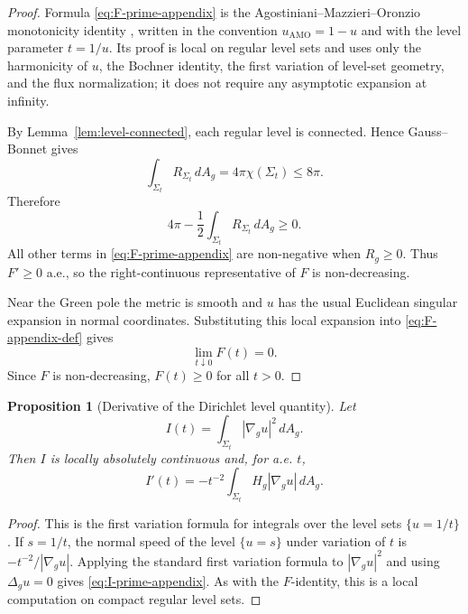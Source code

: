 \documentclass[11pt]{amsart}
\numberwithin{equation}{section}
\newtheorem{proposition}[theorem]{Proposition}
\theoremstyle{definition}
\begin{document}
\begin{proof}
Formula \eqref{eq:F-prime-appendix} is the Agostiniani--Mazzieri--Oronzio monotonicity identity \cite[Theorem~1.1, formula~(1.3)]{AMO}, written in the convention $u_{\mathrm{AMO}}=1-u$ and with the level parameter $t=1/u$.  Its proof is local on regular level sets and uses only the harmonicity of $u$, the Bochner identity, the first variation of level-set geometry, and the flux normalization; it does not require any asymptotic expansion at infinity.

By Lemma~\ref{lem:level-connected}, each regular level is connected.  Hence Gauss--Bonnet gives
$$
        \int_{\Sigma_t} R_{\Sigma_t}\,dA_g=4\pi\chi(\Sigma_t)\le8\pi.
$$
Therefore
$$
        4\pi-\frac12\int_{\Sigma_t}R_{\Sigma_t}\,dA_g\ge0.
$$
All other terms in \eqref{eq:F-prime-appendix} are non-negative when $R_g\ge0$.  Thus $F'\ge0$ a.e., so the right-continuous representative of $F$ is non-decreasing.

Near the Green pole the metric is smooth and $u$ has the usual Euclidean singular expansion in normal coordinates.  Substituting this local expansion into \eqref{eq:F-appendix-def} gives
$$
        \lim_{t\downarrow0}F(t)=0.
$$
Since $F$ is non-decreasing, $F(t)\ge0$ for all $t>0$.
\end{proof}

\begin{proposition}[Derivative of the Dirichlet level quantity]\label{prop:I-derivative}
Let
$$
        I(t)=\int_{\Sigma_t}|\nabla_g u|^2\,dA_g.
$$
Then $I$ is locally absolutely continuous and, for a.e. $t$,
\begin{equation}\label{eq:I-prime-appendix}
        I'(t)=-t^{-2}\int_{\Sigma_t}H_g|\nabla_g u|\,dA_g.
\end{equation}
\end{proposition}

\begin{proof}
This is the first variation formula for integrals over the level sets $\{u=1/t\}$.  If $s=1/t$, the normal speed of the level $\{u=s\}$ under variation of $t$ is $-t^{-2}/|\nabla_g u|$.  Applying the standard first variation formula to $|\nabla_g u|^2$ and using $\Delta_g u=0$ gives \eqref{eq:I-prime-appendix}.  As with the $F$-identity, this is a local computation on compact regular level sets.
\end{proof}
\end{document}
